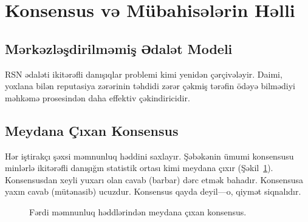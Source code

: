 \documentclass[11pt,a4paper,twocolumn]{article}
\begin{document}
\section{Konsensus və Mübahisələrin Həlli}

\subsection{Mərkəzləşdirilməmiş Ədalət Modeli}

RSN ədaləti ikitərəfli danışıqlar problemi kimi yenidən çərçivələyir. Daimi, yoxlana bilən reputasiya zərərinin təhdidi zərər çəkmiş tərəfin ödəyə bilmədiyi məhkəmə prosesindən daha effektiv çəkindiricidir.

\subsection{Meydana Çıxan Konsensus}

Hər iştirakçı şəxsi məmnunluq həddini saxlayır. Şəbəkənin ümumi konsensusu minlərlə ikitərəfli danışığın statistik ortası kimi meydana çıxır (Şəkil~\ref{fig:consensus}). Konsensusdan xeyli yuxarı olan cavab (barbar) dərc etmək bahadır. Konsensusa yaxın cavab (mütənasib) ucuzdur. Konsensus qayda deyil---o, qiymət siqnalıdır.

\begin{figure}[ht]
\centering
{}
\caption{Fərdi məmnunluq həddlərindən meydana çıxan konsensus.}
\label{fig:consensus}
\end{figure}
\end{document}
